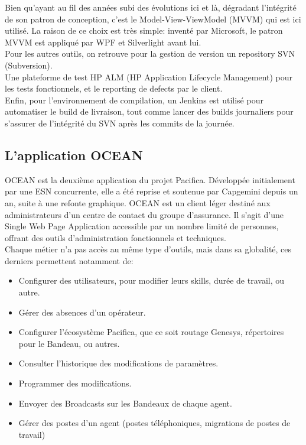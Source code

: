 \documentclass{rapport}
\begin{document}
Bien qu'ayant au fil des années subi des évolutions ici et là, dégradant l'intégrité de son patron de conception, c'est le Model-View-ViewModel (MVVM) qui est ici utilisé. La raison de ce choix est très simple: inventé par Microsoft, le patron MVVM est appliqué par WPF et Silverlight avant lui.\\

Pour les autres outils, on retrouve pour la gestion de version un repository SVN (Subversion).\\
Une plateforme de test HP ALM (HP Application Lifecycle Management) pour les tests fonctionnels, et le reporting de defects par le client.\\
Enfin, pour l'environnement de compilation, un Jenkins est utilisé pour automatiser le build de livraison, tout comme lancer des builds journaliers pour s'assurer de l'intégrité du SVN après les commits de la journée.

\subsection{L'application OCEAN}

OCEAN est la deuxième application du projet Pacifica. Développée initialement par une ESN concurrente, elle a été reprise et soutenue par Capgemini depuis un an, suite à une refonte graphique. OCEAN est un client léger destiné aux administrateurs d'un centre de contact du groupe d'assurance. Il s'agit d'une Single Web Page Application accessible par un nombre limité de personnes, offrant des outils d'administration fonctionnels et techniques.\\
Chaque métier n'a pas accès au même type d'outils, mais dans sa globalité, ces derniers permettent notamment de:\\

\begin{itemize}
\item Configurer des utilisateurs, pour modifier leurs skills, durée de travail, ou autre.
\item Gérer des absences d'un opérateur.
\item Configurer l'écosystème Pacifica, que ce soit routage Genesys, répertoires pour le Bandeau, ou autres.
\item Consulter l'historique des modifications de paramètres.
\item Programmer des modifications.
\item Envoyer des Broadcasts sur les Bandeaux de chaque agent.
\item Gérer des postes d'un agent (postes téléphoniques, migrations de postes de travail)
\end{itemize}
\end{document}
